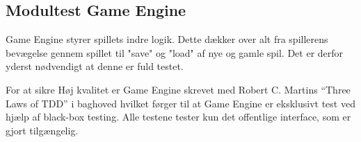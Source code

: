 \subsection{Modultest Game Engine}
Game Engine styrer spillets indre logik. Dette dækker over alt fra spillerens bevægelse gennem spillet til "save" og "load" af nye og gamle spil.
Det er derfor yderst nødvendigt at denne er fuld testet.

For at sikre Høj kvalitet er Game Engine skrevet med Robert C. Martins
``Three Laws of TDD'' \parencite{CleanCode} i baghoved hvilket førger til at Game Engine er 
eksklusivt test ved hjælp af black-box testing. Alle testene tester
kun det offentlige interface, som er gjort tilgængelig. 
\newpage 



\newpage
